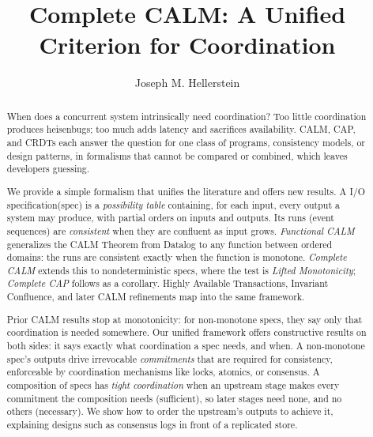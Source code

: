\documentclass[sigconf]{cidr-2027}
\theoremstyle{remark}
\newcommand{\commitment}{commitment\xspace}
\newcommand{\commitments}{commitments\xspace}
\newcommand{\spectype}[1][]{I/O specification#1\xspace}
\begin{document}
\title{Complete CALM: A Unified Criterion for Coordination}

\author{Joseph M. Hellerstein}

\begin{abstract}

\textcolor{reviewed}{When does a concurrent system intrinsically need coordination?} \textcolor{reviewed}{Too little
coordination produces heisenbugs; too much adds latency and sacrifices
availability.} \textcolor{reviewed}{CALM, CAP, and CRDTs each answer the question for one class of
programs, consistency models, or design patterns, in formalisms that cannot be
compared or combined, which leaves developers guessing.}

\textcolor{reviewed}{We provide a simple formalism that unifies the literature and
offers new results.} \textcolor{reviewed}{A \spectype (spec) is a \emph{possibility table} containing, for
each input, every output a system may produce, with partial orders on inputs and
outputs.} \textcolor{reviewed}{Its runs (event sequences) are \emph{consistent} when they are confluent as input grows.} \textcolor{reviewed}{\emph{Functional CALM} generalizes the CALM Theorem from Datalog to any function
between ordered domains: the runs are consistent exactly when the function is
monotone.} \textcolor{reviewed}{\emph{Complete CALM}
extends this to nondeterministic specs, where the test is
\emph{Lifted Monotonicity}; \emph{Complete CAP} follows as a corollary.} \textcolor{reviewed}{Highly Available Transactions, Invariant Confluence, and later CALM refinements
map into the same framework.}

\textcolor{reviewed}{Prior CALM results stop at monotonicity: for non-monotone
specs, they say only that coordination is needed somewhere.} Our
unified framework offers constructive results on both sides: it says exactly
what coordination a spec needs, and when. \textcolor{reviewed}{A non-monotone
spec's outputs drive irrevocable \emph{\commitments} that are required for consistency,
enforceable by coordination mechanisms like locks, atomics, or consensus.} \textcolor{reviewed}{A composition of specs has \emph{tight coordination} when an upstream stage makes every \commitment the composition needs (sufficient), so later stages need none, and no others (necessary).} \textcolor{reviewed}{We show how to order the upstream's outputs to achieve it, explaining designs such
as consensus logs in front of a replicated store.}

\end{abstract}
\end{document}
